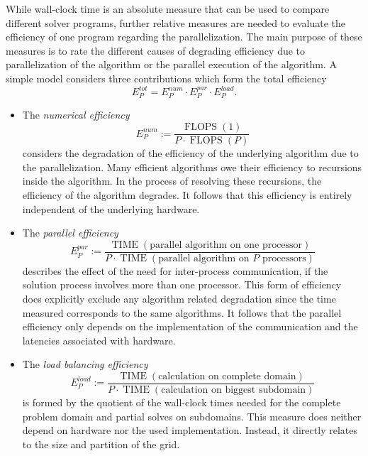 While wall-clock time is an absolute measure that can be used to compare different solver programs, further relative measures are needed to evaluate the efficiency of one program regarding the parallelization. The main purpose of these measures is to rate the different causes of degrading efficiency due to parallelization of the algorithm or the parallel execution of the algorithm. A simple model \cite{ferziger02,schaefer99} considers three contributions which form the total efficiency
\begin{equation}
  \label{eq:efficiency}
  E^{tot}_P = E^{num}_P \cdot E^{par}_P \cdot E^{load}_P.
\end{equation}
\begin{itemize}
  \item[] The \emph{numerical efficiency}
  \begin{displaymath} E^{num}_P := \frac{\operatorname{FLOPS}(1)}{P \cdot \operatorname{FLOPS}(P)}\end{displaymath} 
    considers the degradation of the efficiency of the underlying algorithm due to the parallelization. Many efficient algorithms owe their efficiency to recursions inside the algorithm. In the process of resolving these recursions, the efficiency of the algorithm degrades. It follows that this efficiency is entirely independent of the underlying hardware.
  \item[] The \emph{parallel efficiency}
    \begin{displaymath} E^{par}_P :=\frac{\operatorname{TIME}(\text{parallel algorithm on one processor})}{P \cdot \operatorname{TIME}(\text{parallel algorithm on \(P\) processors})} \end{displaymath} 
      describes the effect of the need for inter-process communication, if the solution process involves more than one processor. This form of efficiency does explicitly exclude any algorithm related degradation since the time measured corresponds to the same algorithms. It follows that the parallel efficiency only depends on the implementation of the communication and the latencies associated with hardware.
  \item[] The \emph{load balancing efficiency} 
    \begin{displaymath} E^{load}_P :=\frac{\operatorname{TIME}(\text{calculation on complete domain})}{P \cdot \operatorname{TIME}(\text{calculation on biggest subdomain})} \end{displaymath}
       is formed by the quotient of the wall-clock times needed for the complete problem domain and partial solves on subdomains. This measure does neither depend on hardware nor the used implementation. Instead, it directly relates to the size and partition of the grid. 
\end{itemize}

